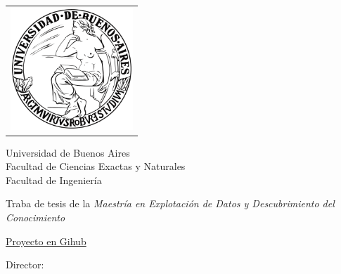 \newcommand{\HRule}{\rule{\linewidth}{0.2mm}}
%
\thispagestyle{empty}

\begin{center}\leavevmode

	\vspace{-2cm}

	\begin{tabular}{l}
		\includegraphics[width=4.6cm]{./images/logouba.png}
	\end{tabular}

	{\large \sc Universidad de Buenos Aires\\Facultad de Ciencias Exactas y Naturales \\ Facultad de Ingeniería}

	\vspace{5.0cm}

	\begin{huge}
		\textbf{\tituloTesis}
	\end{huge}

	\vspace{2cm}

	{\large Traba de tesis de la \textit{Maestría en Explotación de Datos y Descubrimiento del Conocimiento}}
	\vspace{2cm}

	{\large \href{https://github.com/adrianmarino/thesis-paper}{Proyecto en Gihub}}

	\vspace{2cm}

	{\Large \autor}

\end{center}

\vfill

{\large

	{Director: \director}

	\vspace{.2cm}

	\lugar
}

\newpage\thispagestyle{empty}
